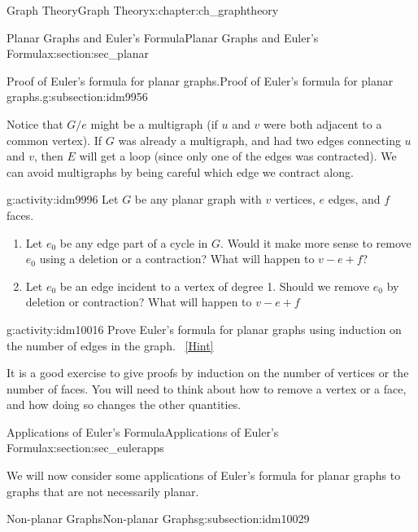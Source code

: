 \documentclass[oneside,10pt,]{book}
\numberwithin{equation}{chapter}
\begin{document}
\begin{chapterptx}{Graph Theory}{}{Graph Theory}{}{}{x:chapter:ch_graphtheory}
\begin{sectionptx}{Planar Graphs and Euler's Formula}{}{Planar Graphs and Euler's Formula}{}{}{x:section:sec_planar}
\begin{subsectionptx}{Proof of Euler's formula for planar graphs.}{}{Proof of Euler's formula for planar graphs.}{}{}{g:subsection:idm9956}
\begin{enumerate}
\end{enumerate}
Notice that \(G/e\) might be a multigraph (if \(u\) and \(v\) were both adjacent to a common vertex).  If \(G\) was already a multigraph, and had two edges connecting \(u\) and \(v\), then \(E\) will get a loop (since only one of the edges was contracted).  We can avoid multigraphs by being careful which edge we contract along.%
\begin{activity}{}{g:activity:idm9996}%
Let \(G\) be any planar graph with \(v\) vertices, \(e\) edges, and \(f\) faces.%
\begin{enumerate}[font=\bfseries,label=(\alph*),ref=\alph*]
\item{}Let \(e_0\) be any edge part of a cycle in \(G\).  Would it make more sense to remove \(e_0\) using a deletion or a contraction?  What will happen to \(v - e + f\)?%
\item{}Let \(e_0\) be an edge incident to a vertex of degree 1.  Should we remove \(e_0\) by deletion or contraction?  What will happen to \(v- e + f\)%
\end{enumerate}
\end{activity}
\begin{activity}{}{g:activity:idm10016}%
Prove Euler's formula for planar graphs using induction on the number of edges in the graph.%
\qquad~\hfill{\tiny\hyperlink{g:hint:idm10019-back}{[Hint]}}\end{activity}
It is a good exercise to give proofs by induction on the number of vertices or the number of faces.  You will need to think about how to remove a vertex or a face, and how doing so changes the other quantities.%
\end{subsectionptx}
\end{sectionptx}
%
%
\typeout{************************************************}
\typeout{************************************************}
%
\begin{sectionptx}{Applications of Euler's Formula}{}{Applications of Euler's Formula}{}{}{x:section:sec_eulerapps}
\begin{introduction}{}%
We will now consider some applications of Euler's formula for planar graphs to graphs that are not necessarily planar.%
\end{introduction}%
%
%
\typeout{************************************************}
\typeout{************************************************}
%
\begin{subsectionptx}{Non-planar Graphs}{}{Non-planar Graphs}{}{}{g:subsection:idm10029}

\end{subsectionptx}
\end{sectionptx}
\end{chapterptx}
\end{document}
